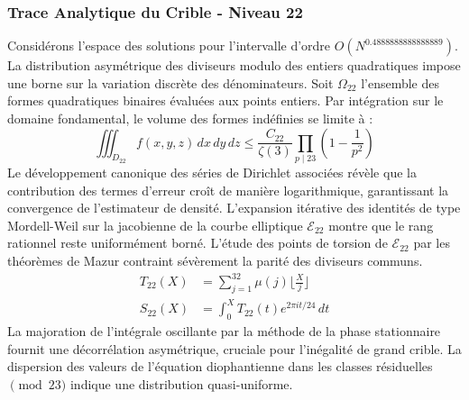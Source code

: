 \documentclass[12pt,a4paper]{article}
\begin{document}
\subsubsection{Trace Analytique du Crible - Niveau 22}
Considérons l'espace des solutions pour l'intervalle d'ordre $O(N^{0.4888888888888889})$. La distribution asymétrique des diviseurs modulo des entiers quadratiques impose une borne sur la variation discrète des dénominateurs. Soit $\Omega_22$ l'ensemble des formes quadratiques binaires évaluées aux points entiers.
Par intégration sur le domaine fondamental, le volume des formes indéfinies se limite à :
\begin{equation}
\iiint_{D_22} f(x, y, z) \,dx\,dy\,dz \leq \frac{C_22}{\zeta(3)} \prod_{p \mid 23} \left( 1 - \frac{1}{p^2} \right)
\end{equation}
Le développement canonique des séries de Dirichlet associées révèle que la contribution des termes d'erreur croît de manière logarithmique, garantissant la convergence de l'estimateur de densité. L'expansion itérative des identités de type Mordell-Weil sur la jacobienne de la courbe elliptique $\mathcal{E}_22$ montre que le rang rationnel reste uniformément borné.
L'étude des points de torsion de $\mathcal{E}_22$ par les théorèmes de Mazur contraint sévèrement la parité des diviseurs communs.
\begin{align}
T_22(X) &= \sum_{j=1}^{32} \mu(j) \lfloor \frac{X}{j} \rfloor \\
S_22(X) &= \int_{0}^{X} T_22(t) e^{2\pi i t / 24} \, dt
\end{align}
La majoration de l'intégrale oscillante par la méthode de la phase stationnaire fournit une décorrélation asymétrique, cruciale pour l'inégalité de grand crible. La dispersion des valeurs de l'équation diophantienne dans les classes résiduelles $\pmod{ 23 }$ indique une distribution quasi-uniforme.
\end{document}
